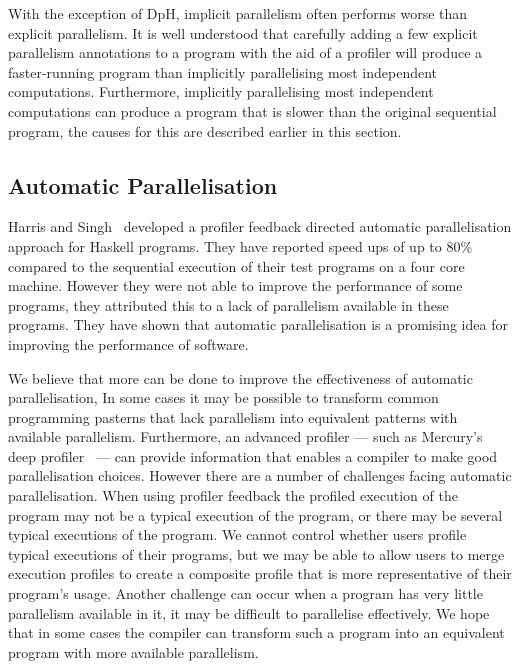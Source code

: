 With the exception of DpH, implicit parallelism often performs worse
than explicit parallelism.
It is well understood that carefully adding a few explicit parallelism annotations
to a program with the aid of a profiler will produce a faster-running
program than implicitly parallelising most independent computations.
Furthermore, implicitly parallelising most independent computations
can produce a program that is slower than the original sequential
program, the causes for this are described earlier in this section.

\subsection{Automatic Parallelisation}
\label{sec:lit_automatic-parallelisation}

Harris and Singh~\cite{haskell-imp-par} developed a profiler feedback
directed automatic parallelisation approach for Haskell programs.
They have reported speed ups of up to 80\% compared to the sequential
execution of their test programs on a four core machine.
However they were not able to improve the performance of some
programs, they attributed this to a lack of parallelism
available in these programs.
They have shown that automatic parallelisation is a promising idea for
improving the performance of software.

We believe that more can be done to improve the effectiveness of
automatic parallelisation,
In some cases it may be possible to transform common programming
pasterns that lack parallelism into equivalent patterns with available
parallelism.
Furthermore, an advanced profiler --- such as Mercury's deep
profiler~\cite{conway:2001:mercury-deep} --- can provide information
that enables a compiler to make good parallelisation choices.
However there are a number of challenges facing automatic
parallelisation.
When using profiler feedback the profiled execution of the program may
not be a typical execution of the program, or there may be several
typical executions of the program.
We cannot control whether users profile typical executions of their
programs, but we may be able to allow users to merge execution
profiles to create a composite profile that is more representative of
their program's usage.
Another challenge can occur when a program has very little parallelism
available in it, it may be difficult to parallelise effectively.
We hope that in some cases the compiler can transform such a program
into an equivalent program with more available parallelism.

